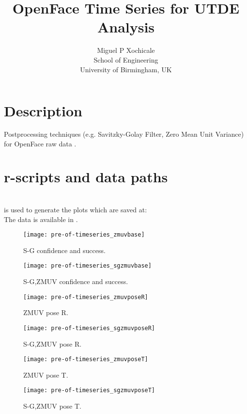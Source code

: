 \documentclass[a4paper,12pt]{article}
\title{OpenFace Time Series for UTDE Analysis}
\author{Miguel P Xochicale \\
School of Engineering\\
University of Birmingham, UK}
\begin{document}
\maketitle

%


\section{Description}


Postprocessing techniques (e.g. Savitzky-Golay Filter, Zero Mean Unit Variance)
for OpenFace raw data \cite{baltrusaitis2016}.


\section{r-scripts and data paths}
 \\
is used to generate the plots which are saved at: \\
The data is available in \cite{mxochicale2018}.













\begin{figure}
\centering
\texttt{[image: pre-of-timeseries\_zmuvbase]}
\caption{S-G confidence and success.}
\end{figure}

\begin{figure}
\centering
\texttt{[image: pre-of-timeseries\_sgzmuvbase]}
\caption{S-G,ZMUV confidence and success.}
\end{figure}




\begin{figure}
\centering
\texttt{[image: pre-of-timeseries\_zmuvposeR]}
\caption{ZMUV pose R.}
\end{figure}



\begin{figure}
\centering
\texttt{[image: pre-of-timeseries\_sgzmuvposeR]}
\caption{S-G,ZMUV pose R.}
\end{figure}


\begin{figure}
\centering
\texttt{[image: pre-of-timeseries\_zmuvposeT]}
\caption{ZMUV pose T.}
\end{figure}

\begin{figure}
\centering
\texttt{[image: pre-of-timeseries\_sgzmuvposeT]}
\caption{S-G,ZMUV pose T.}
\end{figure}
\end{document}
